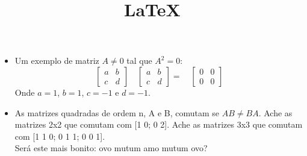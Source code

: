\documentclass[11pt]{article}
\title{\LaTeX}
\date{}
\begin{document}
  \maketitle

\begin{itemize}
\item Um exemplo de matriz $A \neq 0$ tal que $A^2=0$:
$$
\left[\begin{array}{rr}
a&b\\
c&d
\end{array}\right]
\quad
\left[\begin{array}{cc}
a&b\\
c&d
\end{array}\right]
=
\quad
\left[\begin{array}{cc}
0&0\\
0&0
\end{array}\right]
$$
Onde $a=1$, $b=1$, $c=-1$ e $d=-1$.
\item As matrizes quadradas de ordem n, A e B, comutam se $AB \neq BA$. Ache as matrizes 2x2 que comutam com [1 0; 0 2]. Ache as matrizes 3x3 que comutam com [1 1 0; 0 1 1; 0 0 1].
\\ Será este mais bonito: ovo mutum amo mutum ovo?
\end{itemize}



%
%
%
%
%
%
%
%
%
%
%
%
								
\end{document}
